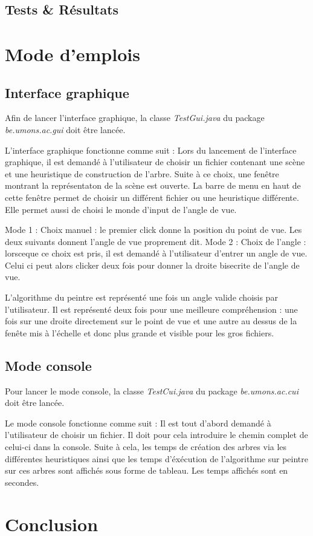 \documentclass[11pt,a4paper]{article}
\begin{document}
\subsection{Tests \& Résultats}
\section{Mode d'emplois}

\subsection{Interface graphique}

Afin de lancer l'interface graphique, la classe \textit{TestGui.java} du package \textit{be.umons.ac.gui} doit être lancée. 

L'interface graphique fonctionne comme suit :
Lors du lancement de l'interface graphique, il est demandé à l'utilisateur de choisir un fichier contenant une scène et une heuristique de construction de l'arbre. Suite à ce choix, une fenêtre montrant la représentaton de la scène est ouverte. La barre de menu en haut de cette fenêtre permet de choisir un différent fichier ou une heuristique différente. Elle permet aussi de choisi le monde d'input de l'angle de vue.

Mode 1 : Choix manuel : le premier click donne la position du point de vue. Les deux suivants donnent l'angle de vue proprement dit.
Mode 2 : Choix de l'angle : lorsceque ce choix est pris, il est demandé à l'utilisateur d'entrer un angle de vue. Celui ci peut alors clicker deux fois pour donner la droite bisecrite de l'angle de vue.

L'algorithme du peintre est représenté une fois un angle valide choisis par l'utilisateur. Il est représenté deux fois pour une meilleure compréhension : une fois sur une droite directement sur le point de vue et une autre au dessus de la fenête mis à l'échelle et donc plus grande et visible pour les gros fichiers.

\subsection{Mode console}

Pour lancer le mode console, la classe \textit{TestCui.java} du package \textit{be.umons.ac.cui} doit être lancée.

Le mode console fonctionne comme suit :
Il est tout d'abord demandé à l'utilisateur de choisir un fichier. Il doit pour cela introduire le chemin complet de celui-ci dans la console. Suite à cela, les temps de création des arbres via les différentes heuristiques ainsi que les temps d'éxécution de l'algorithme sur peintre sur ces arbres sont affichés sous forme de tableau. Les temps affichés sont en secondes. 

\section*{Conclusion}

\end{document}
